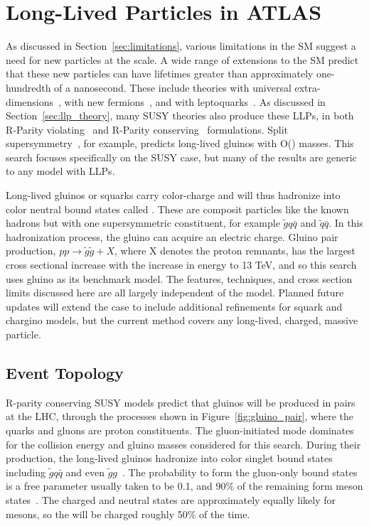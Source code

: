 \chapter{Long-Lived Particles in ATLAS}

\label{ch:simulation}

As discussed in Section~\ref{sec:limitations}, various limitations in the \ac{SM} suggest a need for new particles at the \TeV scale. 
A wide range of extensions to the \acl{SM} predict that these new particles can have lifetimes greater than approximately one-hundredth of a nanosecond.
These include theories with universal extra-dimensions~\cite{extra_dim1, extra_dim2}, with new fermions~\cite{newfermions}, and with leptoquarks~\cite{leptoquark}.
As discussed in Section~\ref{sec:llp_theory}, many \ac{SUSY} theories also produce these \acp{LLP}, in both R-Parity violating~\cite{rpv1, rpv2, rpv3} and R-Parity conserving~\cite{rpc1, rpc2, rpc3, rpc4} formulations.
Split supersymmetry~\cite{split1, split2}, for example, predicts long-lived gluinos with O(\TeV) masses.
This search focuses specifically on the \ac{SUSY} case, but many of the results are generic to any model with \acp{LLP}. 

Long-lived gluinos or squarks carry color-charge and will thus hadronize into color neutral bound states called \rhadrons.
These are composit particles like the known hadrons but with one supersymmetric constituent, for example $\tilde{g}q\bar{q}$ and $\tilde{q}\bar{q}$.
In this hadronization process, the gluino can acquire an electric charge.
Gluino pair production, $p p\rightarrow \tilde{g}\tilde{g} + X$, where X denotes the proton remnants, has the largest cross sectional increase with the increase in energy to 13 TeV, and so this search uses gluino \rhadrons as its benchmark model.
The features, techniques, and cross section limits discussed here are all largely independent of the model.
Planned future updates will extend the case to include additional refinements for squark and chargino models, but the current method covers any long-lived, charged, massive particle.

\section{Event Topology}
\label{sec:characteristics}

R-parity conserving  SUSY models predict that gluinos will be produced in pairs at the \ac{LHC}, through the processes shown in Figure~\ref{fig:gluino_pair}, where the quarks and gluons are proton constituents.
The gluon-initiated mode dominates for the collision energy and gluino masses considered for this search.
During their production, the long-lived gluinos hadronize into color singlet bound states including $\tilde{g}q\bar{q}$ and even $\tilde{g}g$~\cite{rhadron}.
The probability to form the gluon-only bound states is a free parameter usually taken to be 0.1, and 90\% of the remaining \rhadrons form meson states~\cite{rhad_atlas}.
The charged and neutral states are approximately equally likely for mesons, so the \rhadrons will be charged roughly 50\% of the time.

